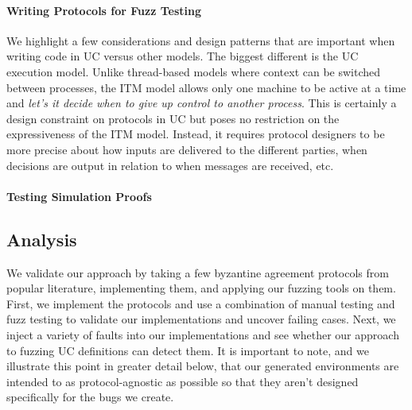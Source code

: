 \paragraph{Writing Protocols for Fuzz Testing}
We highlight a few considerations and design patterns that are important when writing code in UC versus other models.
The biggest different is the UC execution model. 
Unlike thread-based models where context can be switched between processes, the ITM model allows only one machine to be active at a time and \emph{let's it decide when to give up control to another process}.
This is certainly a design constraint on protocols in UC but poses no restriction on the expressiveness of the ITM model.
Instead, it requires protocol designers to be more precise about how inputs are delivered to the different parties, when decisions are output in relation to when messages are received, etc. 



\paragraph{Testing Simulation Proofs}


\subsection{Analysis}
We validate our approach by taking a few byzantine agreement protocols from popular literature, implementing them, and applying our fuzzing tools on them. 
First, we implement the protocols and use a combination of manual testing and fuzz testing to validate our implementations and uncover failing cases. 
Next, we inject a variety of faults into our implementations and see whether our approach to fuzzing UC definitions can detect them.
It is important to note, and we illustrate this point in greater detail below, that our generated environments are intended to as protocol-agnostic as possible so that they aren't designed specifically for the bugs we create.

